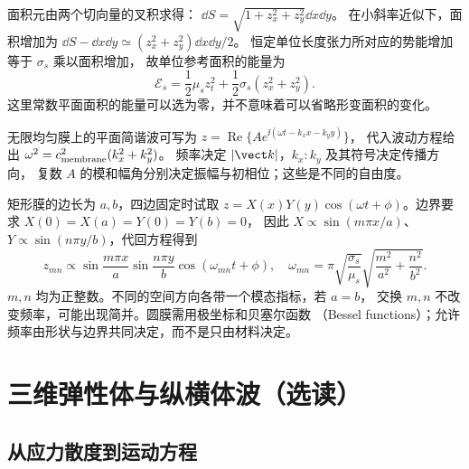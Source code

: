 面积元由两个切向量的叉积求得：
$\dd S=\sqrt{1+z_x^2+z_y^2}\dd x\dd y$。
在小斜率近似下，面积增加为
$\dd S-\dd x\dd y\simeq(z_x^2+z_y^2)\dd x\dd y/2$。
恒定单位长度张力所对应的势能增加等于 $\sigma_s$ 乘以面积增加，
故单位参考面积的能量为
\begin{equation}
 \mathcal E_s=\frac12\mu_s z_t^2+\frac12\sigma_s(z_x^2+z_y^2).
 \label{ch12:eq:membrane-energy}
\end{equation}
这里常数平面面积的能量可以选为零，并不意味着可以省略形变面积的变化。

无限均匀膜上的平面简谐波可写为
$z=\operatorname{Re}\{A e^{\ii(\omega t-k_xx-k_yy)}\}$，
代入波动方程给出
$\omega^2=c_{\rm membrane}^2(k_x^2+k_y^2)$。
频率决定 $|\vect k|$，$k_x:k_y$ 及其符号决定传播方向，
复数 $A$ 的模和幅角分别决定振幅与初相位；这些是不同的自由度。

矩形膜的边长为 $a,b$，四边固定时试取
$z=X(x)Y(y)\cos(\omega t+\phi)$。边界要求 $X(0)=X(a)=Y(0)=Y(b)=0$，
因此 $X\propto\sin(m\pi x/a)$、$Y\propto\sin(n\pi y/b)$，代回方程得到
\begin{equation}
 z_{mn}\propto\sin\frac{m\pi x}{a}\sin\frac{n\pi y}{b}\cos(\omega_{mn}t+\phi),
 \quad
 \omega_{mn}=\pi\sqrt{\frac{\sigma_s}{\mu_s}}
 \sqrt{\frac{m^2}{a^2}+\frac{n^2}{b^2}}.
 \label{ch12:eq:membrane-modes}
\end{equation}
$m,n$ 均为正整数。不同的空间方向各带一个模态指标，若 $a=b$，
交换 $m,n$ 不改变频率，可能出现简并。圆膜需用极坐标和贝塞尔函数
（Bessel functions）；允许频率由形状与边界共同决定，而不是只由材料决定。

\section{三维弹性体与纵横体波（选读）}

\subsection{从应力散度到运动方程}

